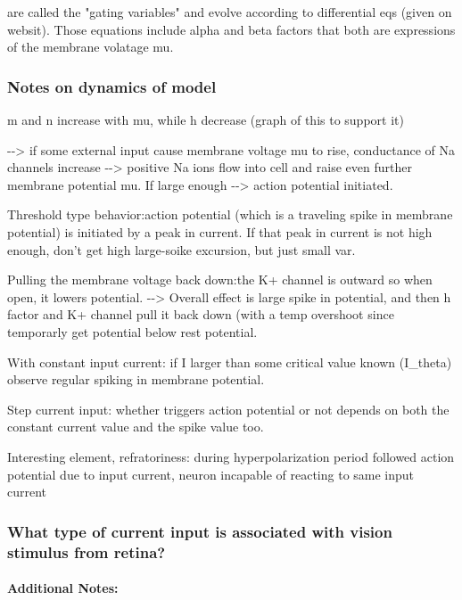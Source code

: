 \documentclass[11pt]{article}
\begin{document}
are called the "gating variables" and evolve according to differential
eqs (given on websit). Those equations include alpha and beta factors
that both are expressions of the membrane volatage mu.

\subsubsection{Notes on dynamics of
model}\label{notes-on-dynamics-of-model}

m and n increase with mu, while h decrease (graph of this to support it)

-\/-\textgreater{} if some external input cause membrane voltage mu to
rise, conductance of Na channels increase -\/-\textgreater{} positive Na
ions flow into cell and raise even further membrane potential mu. If
large enough -\/-\textgreater{} action potential initiated.

Threshold type behavior:action potential (which is a traveling spike in
membrane potential) is initiated by a peak in current. If that peak in
current is not high enough, don't get high large-soike excursion, but
just small var.

Pulling the membrane voltage back down:the K+ channel is outward so when
open, it lowers potential. -\/-\textgreater{} Overall effect is large
spike in potential, and then h factor and K+ channel pull it back down
(with a temp overshoot since temporarly get potential below rest
potential.

With constant input current: if I larger than some critical value known
(I\_theta) observe regular spiking in membrane potential.

Step current input: whether triggers action potential or not depends on
both the constant current value and the spike value too.

Interesting element, refratoriness: during hyperpolarization period
followed action potential due to input current, neuron incapable of
reacting to same input current

\subsubsection{What type of current input is associated with vision
stimulus from
retina?}\label{what-type-of-current-input-is-associated-with-vision-stimulus-from-retina}

\paragraph{Additional Notes:}\label{additional-notes}
\end{document}
